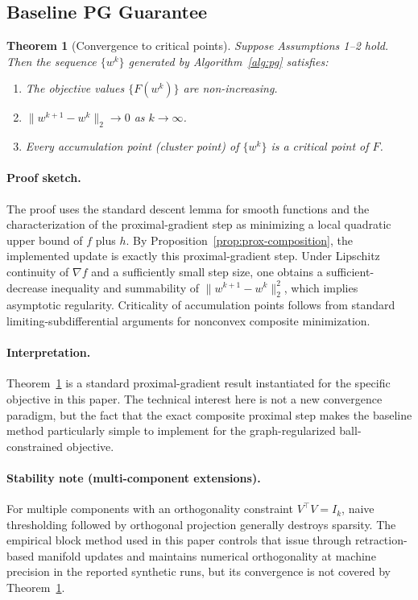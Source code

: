\documentclass[10pt,twocolumn,letterpaper]{article}
\newtheorem{theorem}{Theorem}
\theoremstyle{definition}
\begin{document}
\subsection{Baseline PG Guarantee}
\begin{theorem}[Convergence to critical points]
\label{thm:conv}
Suppose Assumptions 1--2 hold. Then the sequence $\{w^k\}$ generated by Algorithm~\ref{alg:pg} satisfies:
\begin{enumerate}[leftmargin=*]
\item The objective values $\{F(w^k)\}$ are non-increasing.
\item $\|w^{k+1}-w^k\|_2 \to 0$ as $k\to\infty$.
\item Every accumulation point (cluster point) of $\{w^k\}$ is a critical point of $F$.
\end{enumerate}
\end{theorem}

\paragraph{Proof sketch.}
The proof uses the standard descent lemma for smooth functions and the characterization of the proximal-gradient step as minimizing a local quadratic upper bound of $f$ plus $h$. By Proposition~\ref{prop:prox-composition}, the implemented update is exactly this proximal-gradient step. Under Lipschitz continuity of $\nabla f$ and a sufficiently small step size, one obtains a sufficient-decrease inequality and summability of $\|w^{k+1}-w^k\|_2^2$, which implies asymptotic regularity. Criticality of accumulation points follows from standard limiting-subdifferential arguments for nonconvex composite minimization.

\paragraph{Interpretation.}
Theorem~\ref{thm:conv} is a standard proximal-gradient result instantiated for the specific objective in this paper. The technical interest here is not a new convergence paradigm, but the fact that the exact composite proximal step makes the baseline method particularly simple to implement for the graph-regularized ball-constrained objective.

\paragraph{Stability note (multi-component extensions).}
For multiple components with an orthogonality constraint $V^\top V=I_k$, naive thresholding followed by orthogonal projection generally destroys sparsity. The empirical block method used in this paper controls that issue through retraction-based manifold updates and maintains numerical orthogonality at machine precision in the reported synthetic runs, but its convergence is not covered by Theorem~\ref{thm:conv}.
\end{document}
